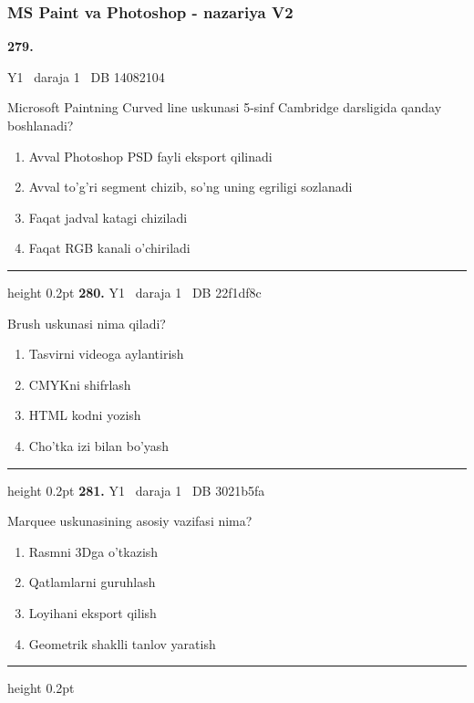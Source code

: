 \documentclass[10pt,a4paper,oneside]{article}
\begin{document}
\subsubsection{MS Paint va Photoshop - nazariya V2}
\hypertarget{q279}{\textbf{\color{ink}279.}}  {\color{muted}\scriptsize Y1 \textbullet\ daraja 1 \textbullet\ DB 14082104}
\par
Microsoft Paintning Curved line uskunasi 5-sinf Cambridge darsligida qanday boshlanadi?
\begin{enumerate}[label=\Alph*),leftmargin=9mm]
\item Avval Photoshop PSD fayli eksport qilinadi
\item Avval to'g'ri segment chizib, so'ng uning egriligi sozlanadi
\item Faqat jadval katagi chiziladi
\item Faqat RGB kanali o'chiriladi
\end{enumerate}
\vspace{2mm}\hrule height 0.2pt \vspace{4mm}
\hypertarget{q280}{\textbf{\color{ink}280.}}  {\color{muted}\scriptsize Y1 \textbullet\ daraja 1 \textbullet\ DB 22f1df8c}
\par
Brush uskunasi nima qiladi?
\begin{enumerate}[label=\Alph*),leftmargin=9mm]
\item Tasvirni videoga aylantirish
\item CMYKni shifrlash
\item HTML kodni yozish
\item Cho'tka izi bilan bo'yash
\end{enumerate}
\vspace{2mm}\hrule height 0.2pt \vspace{4mm}
\hypertarget{q281}{\textbf{\color{ink}281.}}  {\color{muted}\scriptsize Y1 \textbullet\ daraja 1 \textbullet\ DB 3021b5fa}
\par
Marquee uskunasining asosiy vazifasi nima?
\begin{enumerate}[label=\Alph*),leftmargin=9mm]
\item Rasmni 3Dga o'tkazish
\item Qatlamlarni guruhlash
\item Loyihani eksport qilish
\item Geometrik shaklli tanlov yaratish
\end{enumerate}
\vspace{2mm}\hrule height 0.2pt \vspace{4mm}
\end{document}
